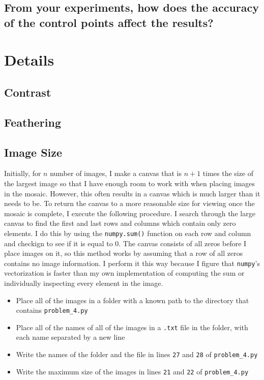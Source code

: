 \documentclass[]{article}
\begin{document}
	\subsection{From your experiments, how does the accuracy of the control points affect the results?}

\section{Details}
	\subsection{Contrast}
	\subsection{Feathering}
	\subsection{Image Size}
	Initially, for $n$ number of images, I make a canvas that is $n+1$ times the size of the largest image so that I have enough room to work with when placing images in the mosaic. However, this often results in a canvas which is much larger than it needs to be. To return the canvas to a more reasonable size for viewing once the mosaic is complete, I execute the following procedure. I search through the large canvas to find the first and last rows and columns which contain only zero elements. I do this by using the \texttt{numpy.sum()} function on each row and column and checkign to see if it is equal to 0. The canvas consists of all zeros before I place images on it, so this method works by assuming that a row of all zeros contains no image information. I perform it this way because I figure that \texttt{numpy}'s vectorization is faster than my own implementation of computing the sum or individually inspecting every element in the image. 
	\begin{itemize}
	\item Place all of the images in a folder with a known path to the directory that contains \texttt{problem\_4.py}
	\item Place all of the names of all of the images in a \texttt{.txt} file in the folder, with each name separated by a new line
	\item Write the names of the folder and the file in lines \texttt{27} and \texttt{28} of \texttt{problem\_4.py}
	\item Write the maximum size of the images in lines \texttt{21} and \texttt{22} of \texttt{problem\_4.py}
	
\end{itemize}
\end{document}
